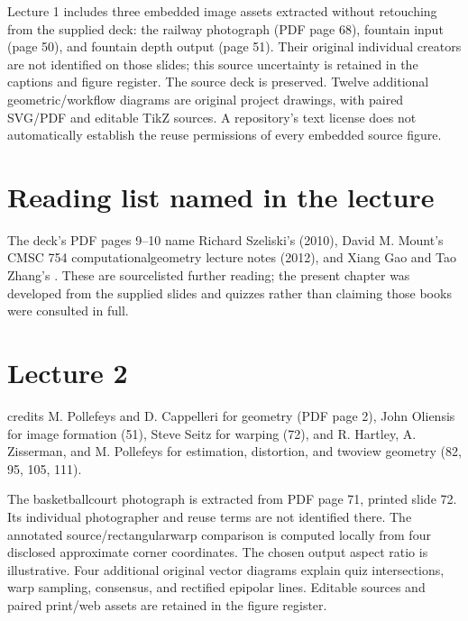 \documentclass[letterpaper,11pt,english,openany,oneside]{jupyterBook}
\begin{document}
\sphinxAtStartPar
Lecture 1 includes three embedded image assets extracted without retouching from the supplied deck: the railway photograph (PDF page 68), fountain input (page 50), and fountain depth output (page 51). Their original individual creators are not identified on those slides; this source uncertainty is retained in the captions and figure register. The source deck is preserved. Twelve additional geometric/workflow diagrams are original project drawings, with paired SVG/PDF and editable TikZ sources. A repository’s text license does not automatically establish the reuse permissions of every embedded source figure.


\section{Reading list named in the lecture}
\label{\detokenize{reference/credits:reading-list-named-in-the-lecture}}
\sphinxAtStartPar
The deck’s PDF pages 9–10 name Richard Szeliski’s  (2010), David M. Mount’s CMSC 754 computational\sphinxhyphen{}geometry lecture notes (2012), and Xiang Gao and Tao Zhang’s . These are source\sphinxhyphen{}listed further reading; the present chapter was developed from the supplied slides and quizzes rather than claiming those books were consulted in full.


\section{Lecture 2}
\label{\detokenize{reference/credits:lecture-2}}
\sphinxAtStartPar
{} credits M. Pollefeys and D. Cappelleri for geometry (PDF page 2), John Oliensis for image formation (51), Steve Seitz for warping (72), and R. Hartley, A. Zisserman, and M. Pollefeys for estimation, distortion, and two\sphinxhyphen{}view geometry (82, 95, 105, 111).

\sphinxAtStartPar
The basketball\sphinxhyphen{}court photograph is extracted from PDF page 71, printed slide 72. Its individual photographer and reuse terms are not identified there. The annotated source/rectangular\sphinxhyphen{}warp comparison is computed locally from four disclosed approximate corner coordinates. The chosen output aspect ratio is illustrative. Four additional original vector diagrams explain quiz intersections, warp sampling, consensus, and rectified epipolar lines. Editable sources and paired print/web assets are retained in the figure register.
\end{document}
